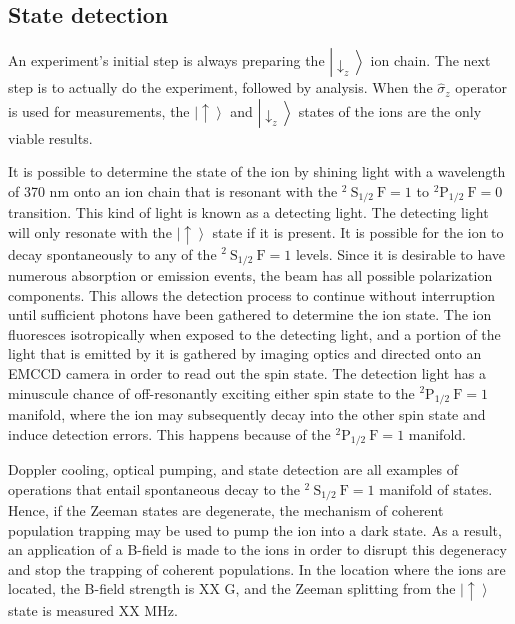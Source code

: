\subsection{State detection}

An experiment's initial step is always preparing the $\left|\downarrow_z\right\rangle$ ion chain. The next step is to actually do the experiment, followed by analysis. When the $\hat{\sigma}_z$ operator is used for measurements, the $\left|\uparrow\right\rangle$ and $\left|\downarrow_z\right\rangle$ states of the ions are the only viable results.

It is possible to determine the state of the ion by shining light with a wavelength of 370 nm onto an ion chain that is resonant with the ${ }^2 \mathrm{~S}_{1 / 2} \mathrm{~F}=1$ to ${ }^2 \mathrm{P}_{1 / 2} \mathrm{~F}=0$ transition. This kind of light is known as a detecting light. The detecting light will only resonate with the $\left|\uparrow\right\rangle$ state if it is present. It is possible for the ion to decay spontaneously to any of the ${ }^2 \mathrm{~S}_{1 / 2} \mathrm{~F}=1$ levels. Since it is desirable to have numerous absorption or emission events, the beam has all possible polarization components. This allows the detection process to continue without interruption until sufficient photons have been gathered to determine the ion state. The ion fluoresces isotropically when exposed to the detecting light, and a portion of the light that is emitted by it is gathered by imaging optics and directed onto an EMCCD camera in order to read out the spin state. The detection light has a minuscule chance of off-resonantly exciting either spin state to the ${ }^2 \mathrm{P}_{1 / 2} \mathrm{~F}=1$ manifold, where the ion may subsequently decay into the other spin state and induce detection errors. This happens because of the ${ }^2 \mathrm{P}_{1 / 2} \mathrm{~F}=1$ manifold.

Doppler cooling, optical pumping, and state detection are all examples of operations that entail spontaneous decay to the ${ }^2 \mathrm{~S}_{1 / 2} \mathrm{~F}=1$ manifold of states. Hence, if the Zeeman states are degenerate, the mechanism of coherent population trapping may be used to pump the ion into a dark state. As a result, an application of a B-field is made to the ions in order to disrupt this degeneracy and stop the trapping of coherent populations. In the location where the ions are located, the B-field strength is XX G, and the Zeeman splitting from the $\left|\uparrow\right\rangle$ state is measured XX MHz.


